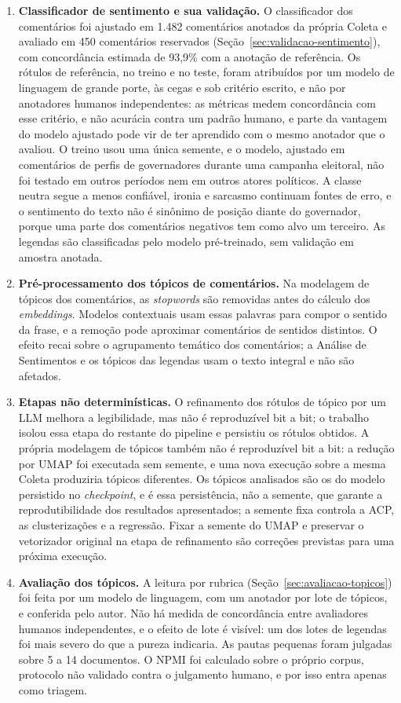 \begin{enumerate}
    \item \textbf{Classificador de sentimento e sua validação.} O classificador dos comentários foi ajustado em 1.482 comentários anotados da própria Coleta e avaliado em 450 comentários reservados (Seção~\ref{sec:validacao-sentimento}), com concordância estimada de 93,9\% com a anotação de referência. Os rótulos de referência, no treino e no teste, foram atribuídos por um modelo de linguagem de grande porte, às cegas e sob critério escrito, e não por anotadores humanos independentes: as métricas medem concordância com esse critério, e não acurácia contra um padrão humano, e parte da vantagem do modelo ajustado pode vir de ter aprendido com o mesmo anotador que o avaliou. O treino usou uma única semente, e o modelo, ajustado em comentários de perfis de governadores durante uma campanha eleitoral, não foi testado em outros períodos nem em outros atores políticos. A classe neutra segue a menos confiável, ironia e sarcasmo continuam fontes de erro, e o sentimento do texto não é sinônimo de posição diante do governador, porque uma parte dos comentários negativos tem como alvo um terceiro. As legendas são classificadas pelo modelo pré-treinado, sem validação em amostra anotada.
    \item \textbf{Pré-processamento dos tópicos de comentários.} Na modelagem de tópicos dos comentários, as \emph{stopwords} são removidas antes do cálculo dos \emph{embeddings}. Modelos contextuais usam essas palavras para compor o sentido da frase, e a remoção pode aproximar comentários de sentidos distintos. O efeito recai sobre o agrupamento temático dos comentários; a Análise de Sentimentos e os tópicos das legendas usam o texto integral e não são afetados.
    \item \textbf{Etapas não determinísticas.} O refinamento dos rótulos de tópico por um LLM melhora a legibilidade, mas não é reproduzível bit a bit; o trabalho isolou essa etapa do restante do pipeline e persistiu os rótulos obtidos. A própria modelagem de tópicos também não é reproduzível bit a bit: a redução por UMAP foi executada sem semente, e uma nova execução sobre a mesma Coleta produziria tópicos diferentes. Os tópicos analisados são os do modelo persistido no \emph{checkpoint}, e é essa persistência, não a semente, que garante a reprodutibilidade dos resultados apresentados; a semente fixa controla a ACP, as clusterizações e a regressão. Fixar a semente do UMAP e preservar o vetorizador original na etapa de refinamento são correções previstas para uma próxima execução.
    \item \textbf{Avaliação dos tópicos.} A leitura por rubrica (Seção~\ref{sec:avaliacao-topicos}) foi feita por um modelo de linguagem, com um anotador por lote de tópicos, e conferida pelo autor. Não há medida de concordância entre avaliadores humanos independentes, e o efeito de lote é visível: um dos lotes de legendas foi mais severo do que a pureza indicaria. As pautas pequenas foram julgadas sobre 5 a 14 documentos. O NPMI foi calculado sobre o próprio corpus, protocolo não validado contra o julgamento humano, e por isso entra apenas como triagem.

\end{enumerate}
